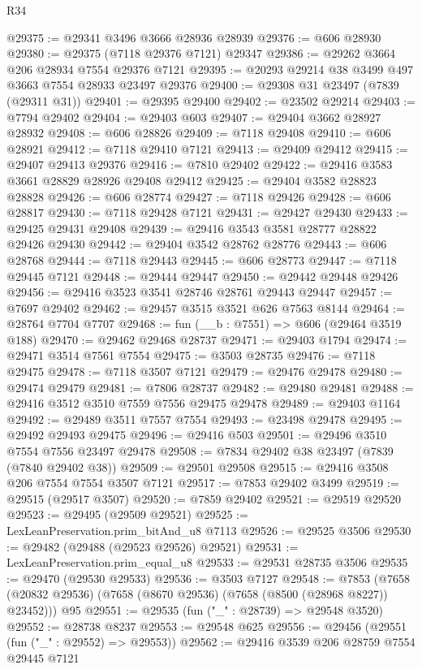 \begin{lexlean}{R34}
\begin{coremodule}
@29375 := @29341 @3496 @3666 @28936 @28939
@29376 := @606 @28930
@29380 := @29375 (@7118 @29376 @7121) @29347
@29386 := @29262 @3664 @206 @28934 @7554 @29376 @7121
@29395 := @20293 @29214 @38 @3499 @497 @3663 @7554 @28933 @23497 @29376
@29400 := @29308 @31 @23497 (@7839 (@29311 @31))
@29401 := @29395 @29400
@29402 := @23502 @29214
@29403 := @7794 @29402
@29404 := @29403 @603
@29407 := @29404 @3662 @28927 @28932
@29408 := @606 @28826
@29409 := @7118 @29408
@29410 := @606 @28921
@29412 := @7118 @29410 @7121
@29413 := @29409 @29412
@29415 := @29407 @29413 @29376
@29416 := @7810 @29402
@29422 := @29416 @3583 @3661 @28829 @28926 @29408 @29412
@29425 := @29404 @3582 @28823 @28828
@29426 := @606 @28774
@29427 := @7118 @29426
@29428 := @606 @28817
@29430 := @7118 @29428 @7121
@29431 := @29427 @29430
@29433 := @29425 @29431 @29408
@29439 := @29416 @3543 @3581 @28777 @28822 @29426 @29430
@29442 := @29404 @3542 @28762 @28776
@29443 := @606 @28768
@29444 := @7118 @29443
@29445 := @606 @28773
@29447 := @7118 @29445 @7121
@29448 := @29444 @29447
@29450 := @29442 @29448 @29426
@29456 := @29416 @3523 @3541 @28746 @28761 @29443 @29447
@29457 := @7697 @29402
@29462 := @29457 @3515 @3521 @626 @7563 @8144
@29464 := @28764 @7704 @7707
@29468 := fun (__b : @7551) => @606 (@29464 @3519 @188)
@29470 := @29462 @29468 @28737
@29471 := @29403 @1794
@29474 := @29471 @3514 @7561 @7554
@29475 := @3503 @28735
@29476 := @7118 @29475
@29478 := @7118 @3507 @7121
@29479 := @29476 @29478
@29480 := @29474 @29479
@29481 := @7806 @28737
@29482 := @29480 @29481
@29488 := @29416 @3512 @3510 @7559 @7556 @29475 @29478
@29489 := @29403 @1164
@29492 := @29489 @3511 @7557 @7554
@29493 := @23498 @29478
@29495 := @29492 @29493 @29475
@29496 := @29416 @503
@29501 := @29496 @3510 @7554 @7556 @23497 @29478
@29508 := @7834 @29402 @38 @23497 (@7839 (@7840 @29402 @38))
@29509 := @29501 @29508
@29515 := @29416 @3508 @206 @7554 @7554 @3507 @7121
@29517 := @7853 @29402 @3499
@29519 := @29515 (@29517 @3507)
@29520 := @7859 @29402
@29521 := @29519 @29520
@29523 := @29495 (@29509 @29521)
@29525 := LexLeanPreservation.prim_bitAnd_u8 @7113
@29526 := @29525 @3506
@29530 := @29482 (@29488 (@29523 @29526) @29521)
@29531 := LexLeanPreservation.prim_equal_u8
@29533 := @29531 @28735 @3506
@29535 := @29470 (@29530 @29533)
@29536 := @3503 @7127
@29548 := @7853
    (@7658 (@20832 @29536) (@7658 (@8670 @29536) (@7658 (@8500 (@28968 @8227)) @23452)))
    @95
@29551 := @29535 (fun ("_" : @28739) => @29548 @3520)
@29552 := @28738 @8237
@29553 := @29548 @625
@29556 := @29456 (@29551 (fun ("_" : @29552) => @29553))
@29562 := @29416 @3539 @206 @28759 @7554 @29445 @7121

\end{coremodule}
\end{lexlean}
